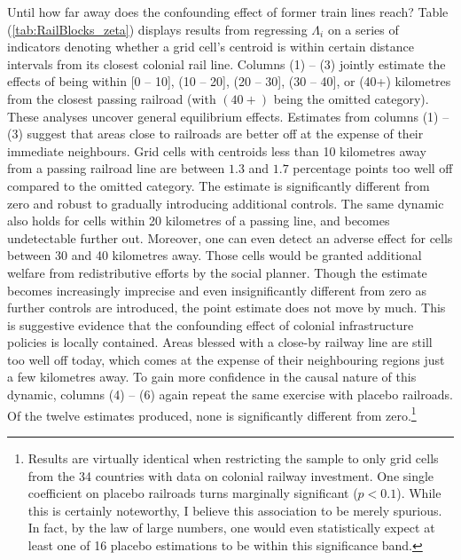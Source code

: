 \documentclass[11pt, oneside]{article}   	%
\let\oldref\ref
\renewcommand{\ref}[1]{(\oldref{#1})}
\begin{document}
Until how far away does the confounding effect of former train lines reach? Table \ref{tab:RailBlocks_zeta} displays results from regressing $\Lambda_{i}$ on a series of indicators denoting whether a grid cell's centroid is within certain distance intervals from its closest colonial rail line. Columns (1) -- (3) jointly estimate the effects of being within [0 -- 10], (10 -- 20], (20 -- 30], (30 -- 40], or (40+) kilometres from the closest passing railroad (with $(40+)$ being the omitted category). These analyses uncover general equilibrium effects. Estimates from columns (1) -- (3) suggest that areas close to railroads are better off at the expense of their immediate neighbours. Grid cells with centroids less than 10 kilometres away from a passing railroad line are between $1.3$ and $1.7$ percentage points too well off compared to the omitted category. The estimate is significantly different from zero and robust to gradually introducing additional controls. The same dynamic also holds for cells within 20 kilometres of a passing line, and becomes undetectable further out. Moreover, one can even detect an adverse effect for cells between 30 and 40 kilometres away. Those cells would be granted additional welfare from redistributive efforts by the social planner. Though the estimate becomes increasingly imprecise and even insignificantly different from zero as further controls are introduced, the point estimate does not move by much. This is suggestive evidence that the confounding effect of colonial infrastructure policies is locally contained. Areas blessed with a close-by railway line are still too well off today, which comes at the expense of their neighbouring regions just a few kilometres away. To gain more confidence in the causal nature of this dynamic, columns (4) -- (6) again repeat the same exercise with placebo railroads. Of the twelve estimates produced, none is significantly different from zero.\footnote{Results are virtually identical when restricting the sample to only grid cells from the 34 countries with data on colonial railway investment. One single coefficient on placebo railroads turns marginally significant ($p<0.1$). While this is certainly noteworthy, I believe this association to be merely spurious. In fact, by the law of large numbers, one would even statistically expect at least one of 16 placebo estimations to be within this significance band.}
\end{document}
